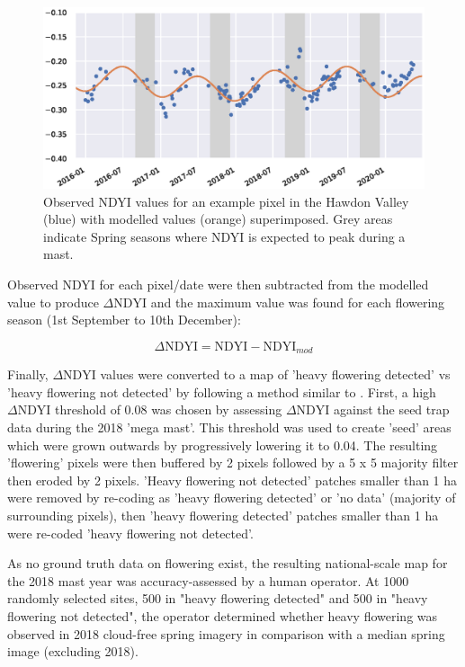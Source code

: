 \documentclass[remotesensing,article,submit,moreauthors,pdftex]{Definitions/mdpi}
\begin{document}
\begin{figure}[H]
    \centering
    \includegraphics[width=\textwidth]{images/figure1_ndyi_coeffs-windscreen_possibility_upscale.eps}
    \caption{Observed NDYI values for an example pixel in the Hawdon Valley (blue) with modelled values (orange)
    superimposed. Grey areas indicate Spring seasons where NDYI is expected to peak during a mast.}
    \label{fig:sine}
\end{figure}  

Observed NDYI for each pixel/date were then subtracted from the modelled value to produce $\Delta\text{NDYI}$ and the
maximum value was found for each flowering season (1st September to 10th December):

\begin{equation}
    \Delta\text{NDYI} = \text{NDYI} - \text{NDYI}_{mod}
\end{equation}

Finally, $\Delta\text{NDYI}$ values were converted to a map of 'heavy flowering detected' vs 'heavy flowering not detected' by following a method similar to \citet{Shepherd2007}. First, a high $\Delta\text{NDYI}$ threshold of 0.08 was chosen by assessing $\Delta\text{NDYI}$ against the seed trap data during the 2018 'mega mast'. This threshold was used to create 'seed' areas which were grown outwards by progressively lowering it to 0.04. The resulting 'flowering' pixels were then buffered by 2 pixels followed by a 5 x 5 majority filter then eroded by 2 pixels. 'Heavy flowering not detected' patches smaller than 1 ha were removed by re-coding as 'heavy flowering detected' or 'no data' (majority of surrounding pixels), then 'heavy flowering detected' patches smaller than 1 ha were re-coded 'heavy flowering not detected'. 

As no ground truth data on flowering exist, the resulting national-scale map for the 2018 mast year was accuracy-assessed by a human operator. At 1000 randomly selected sites, 500 in "heavy flowering detected" and 500 in "heavy flowering not detected", the operator determined whether heavy flowering was observed in 2018 cloud-free spring imagery in comparison with a median spring image (excluding 2018).
\end{document}
